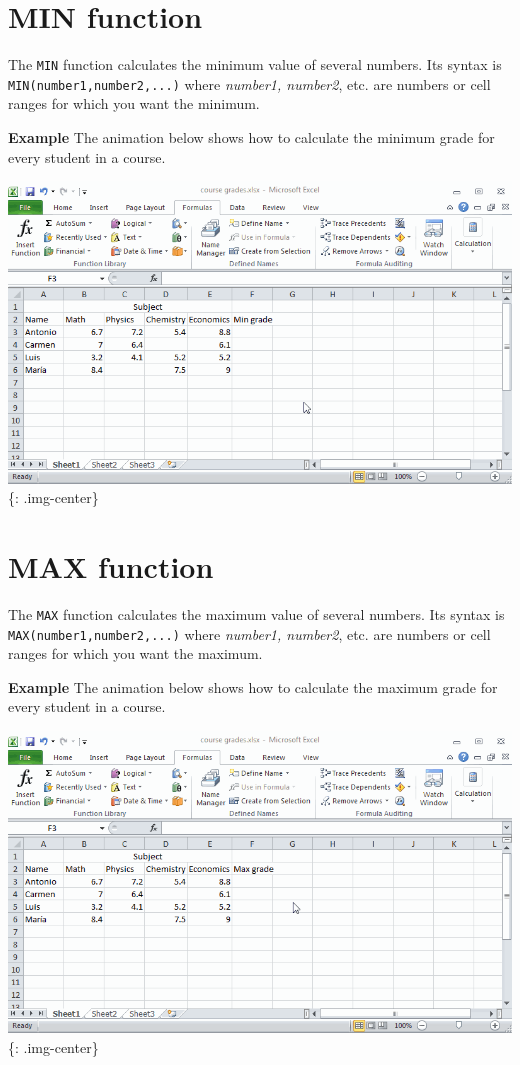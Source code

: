 \section{MIN function}
\label{minfunction}

The \texttt{MIN} function calculates the minimum value of several numbers. Its syntax is \texttt{MIN(number1,number2,...)} where \emph{number1, number2}, etc. are numbers or cell ranges for which you want the minimum. 

\textbf{Example} The animation below shows how to calculate the minimum grade for every student in a course.

\includegraphics[keepaspectratio,width=\textwidth,height=0.75\textheight]{img/example_function_min.gif}
\{: .img-center\}

\section{MAX function}
\label{maxfunction}

The \texttt{MAX} function calculates the maximum value of several numbers. Its syntax is \texttt{MAX(number1,number2,...)} where \emph{number1, number2}, etc. are numbers or cell ranges for which you want the maximum. 

\textbf{Example} The animation below shows how to calculate the maximum grade for every student in a course.

\includegraphics[keepaspectratio,width=\textwidth,height=0.75\textheight]{img/example_function_max.gif}
\{: .img-center\}

